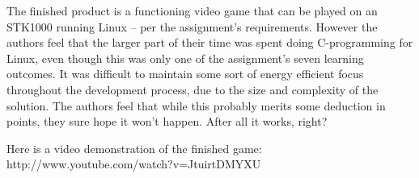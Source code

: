The finished product is a functioning video game that can be played on an STK1000 running Linux -- per the assignment's requirements.
However the authors feel that the larger part of their time was spent doing C-programming for Linux, even though this was only one of the assignment's seven learning outcomes.
It was difficult to maintain some sort of energy efficient focus throughout the development process, due to the size and complexity of the solution.
The authors feel that while this probably merits some deduction in points, they sure hope it won't happen.
After all it works, right?


Here is a video demonstration of the finished game: http://www.youtube.com/watch?v=JtuirtDMYXU
